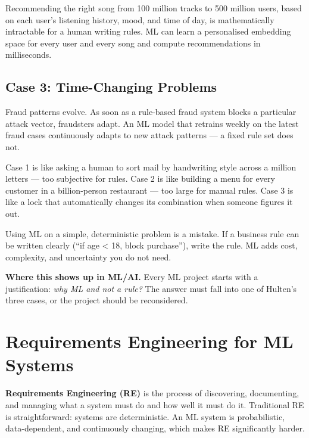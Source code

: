 \documentclass[a4paper,11pt]{article}
\newcommand{\vocab}[1]{\textbf{\color{navy}#1}}
\begin{document}
Recommending the right song from 100 million tracks to 500 million users, based on each user's listening history, mood, and time of day, is mathematically intractable for a human writing rules. ML can learn a personalised embedding space for every user and every song and compute recommendations in milliseconds.

\subsection{Case 3: Time-Changing Problems}

Fraud patterns evolve. As soon as a rule-based fraud system blocks a particular attack vector, fraudsters adapt. An ML model that retrains weekly on the latest fraud cases continuously adapts to new attack patterns --- a fixed rule set does not.

\begin{everyday}
Case 1 is like asking a human to sort mail by handwriting style across a million letters --- too subjective for rules. Case 2 is like building a menu for every customer in a billion-person restaurant --- too large for manual rules. Case 3 is like a lock that automatically changes its combination when someone figures it out.
\end{everyday}

\begin{watchout}
Using ML on a simple, deterministic problem is a mistake. If a business rule can be written clearly (``if age < 18, block purchase''), write the rule. ML adds cost, complexity, and uncertainty you do not need.
\end{watchout}

\noindent\textbf{Where this shows up in ML/AI.} Every ML project starts with a justification: \emph{why ML and not a rule?} The answer must fall into one of Hulten's three cases, or the project should be reconsidered.

\section{Requirements Engineering for ML Systems}

\vocab{Requirements Engineering (RE)} is the process of discovering, documenting, and managing what a system must do and how well it must do it. Traditional RE is straightforward: systems are deterministic. An ML system is probabilistic, data-dependent, and continuously changing, which makes RE significantly harder.
\end{document}
